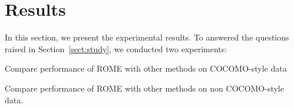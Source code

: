 





\section{Results}

In this section, we present the experimental results. To answered the questions raised in Section~\ref{sect:study}, we conducted two experiments:
\bi
\item Compare performance of ROME with other methods on COCOMO-style data
\item Compare performance of ROME with other methods on non COCOMO-style data.
\ei 

